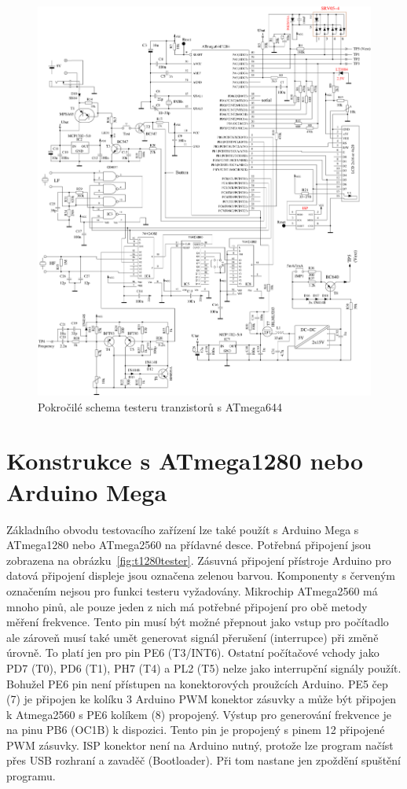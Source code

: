 \label{T644}
\begin{figure}[H]
\centering
\includegraphics[width=18cm]{../FIG/t644tester.pdf}
\caption{Pokročilé schema testeru tranzistorů s ATmega644}
\label{fig:t644tester}
\end{figure}


\section{Konstrukce s ATmega1280 nebo Arduino Mega}
Základního obvodu testovacího zařízení lze také použít s Arduino Mega s ATmega1280 nebo ATmega2560
na přídavné desce.
Potřebná připojení jsou zobrazena na obrázku~\ref{fig:t1280tester}.
Zásuvná připojení přístroje Arduino pro datová připojení displeje jsou označena zelenou barvou.
Komponenty s červeným označením nejsou pro funkci testeru vyžadovány.
Mikrochip ATmega2560 má mnoho pinů, ale pouze jeden z nich má potřebné připojení pro obě metody měření frekvence. 
Tento pin musí být možné přepnout jako vstup pro počítadlo ale zároveň  musí také umět generovat signál přerušení (interrupce) při změně úrovně.
To platí jen pro pin PE6 (T3/INT6). Ostatní počítačové vchody jako PD7 (T0), PD6 (T1), PH7 (T4)
a PL2 (T5) nelze jako interrupční signály použít.
Bohužel PE6 pin není přístupen na konektorových proužcích Arduino.
PE5 čep (7) je připojen ke kolíku 3 Arduino PWM konektor zásuvky a může být připojen k Atmega2560 s PE6 kolíkem (8) propojený.
Výstup pro generování frekvence je na pinu PB6 (OC1B) k dispozici. Tento pin je propojený s pinem 12
připojené PWM zásuvky.
ISP konektor není na Arduino nutný, protože lze program načíst přes USB rozhraní a zavaděč
(Bootloader). Při tom nastane jen zpoždění spuštění programu.

